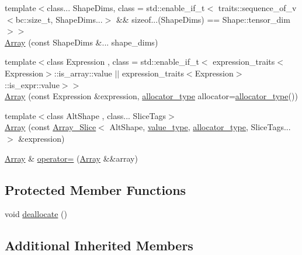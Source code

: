 \begin{DoxyCompactItemize}
\item 
{\footnotesize template$<$class... Shape\+Dims, class  = std\+::enable\+\_\+if\+\_\+t$<$			traits\+::sequence\+\_\+of\+\_\+v$<$bc\+::size\+\_\+t, Shape\+Dims...$>$ \&\&			sizeof...(\+Shape\+Dims) == Shape\+::tensor\+\_\+dim$>$$>$ }\\\hyperlink{structbc_1_1tensors_1_1exprs_1_1Array_a0bdfc60f9711f7334ed0850fd417109c}{Array} (const Shape\+Dims \&... shape\+\_\+dims)
\item 
{\footnotesize template$<$class Expression , class  = std\+::enable\+\_\+if\+\_\+t$<$			expression\+\_\+traits$<$\+Expression$>$\+::is\+\_\+array\+::value $\vert$$\vert$			expression\+\_\+traits$<$\+Expression$>$\+::is\+\_\+expr\+::value$>$$>$ }\\\hyperlink{structbc_1_1tensors_1_1exprs_1_1Array_a33daff032fc7d980dc4c9e336570a718}{Array} (const Expression \&expression, \hyperlink{structbc_1_1tensors_1_1exprs_1_1Array_a990afcebe8817075d427f2653d197140}{allocator\+\_\+type} allocator=\hyperlink{structbc_1_1tensors_1_1exprs_1_1Array_a990afcebe8817075d427f2653d197140}{allocator\+\_\+type}())
\item 
{\footnotesize template$<$class Alt\+Shape , class... Slice\+Tags$>$ }\\\hyperlink{structbc_1_1tensors_1_1exprs_1_1Array_a7cc7a7eb294c67d96f66c52598382991}{Array} (const \hyperlink{classbc_1_1tensors_1_1exprs_1_1Array__Slice}{Array\+\_\+\+Slice}$<$ Alt\+Shape, \hyperlink{structbc_1_1Shape_a52aafd6585a5eae8a3b82f650d3afc1c}{value\+\_\+type}, \hyperlink{structbc_1_1tensors_1_1exprs_1_1Array_a990afcebe8817075d427f2653d197140}{allocator\+\_\+type}, Slice\+Tags... $>$ \&expression)
\item 
\hyperlink{structbc_1_1tensors_1_1exprs_1_1Array}{Array} \& \hyperlink{structbc_1_1tensors_1_1exprs_1_1Array_ad5b1cbbee83ed001d18012df27ebdef8}{operator=} (\hyperlink{structbc_1_1tensors_1_1exprs_1_1Array}{Array} \&\&array)
\end{DoxyCompactItemize}
\subsection*{Protected Member Functions}
\begin{DoxyCompactItemize}
\item 
void \hyperlink{structbc_1_1tensors_1_1exprs_1_1Array_a3123e9466102d458b8bcf48bd926559c}{deallocate} ()
\end{DoxyCompactItemize}
\subsection*{Additional Inherited Members}


